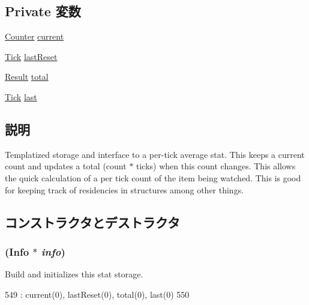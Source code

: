 \subsection*{Private 変数}
\begin{DoxyCompactItemize}
\item 
\hyperlink{namespaceStats_ac35128c026c72bb36af9cea00774e8a6}{Counter} \hyperlink{classStats_1_1AvgStor_a8ffc13ee1adbc256e2b14f5ffd475e46}{current}
\item 
\hyperlink{base_2types_8hh_a5c8ed81b7d238c9083e1037ba6d61643}{Tick} \hyperlink{classStats_1_1AvgStor_a996b16fe37ded6fe6672ce165837dcda}{lastReset}
\item 
\hyperlink{namespaceStats_ad874d2cfd4b4a29ebd480bb2e67f20ae}{Result} \hyperlink{classStats_1_1AvgStor_a7e957a9c5865c112db82214b368136e6}{total}
\item 
\hyperlink{base_2types_8hh_a5c8ed81b7d238c9083e1037ba6d61643}{Tick} \hyperlink{classStats_1_1AvgStor_ab8f820db3f03367136bd4f90c3e777ae}{last}
\end{DoxyCompactItemize}


\subsection{説明}
Templatized storage and interface to a per-\/tick average stat. This keeps a current count and updates a total (count $\ast$ ticks) when this count changes. This allows the quick calculation of a per tick count of the item being watched. This is good for keeping track of residencies in structures among other things. 

\subsection{コンストラクタとデストラクタ}
\hypertarget{classStats_1_1AvgStor_aff27955b5798abace5a5f0aef2421772}{
\subsubsection[{AvgStor}]{ ({\bf Info} $\ast$ {\em info})}}
\label{classStats_1_1AvgStor_aff27955b5798abace5a5f0aef2421772}
Build and initializes this stat storage. 


\begin{DoxyCode}
549         : current(0), lastReset(0), total(0), last(0)
550     { }
\end{DoxyCode}


